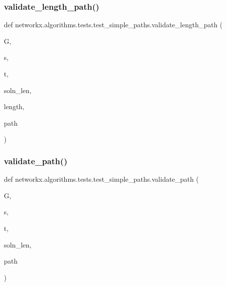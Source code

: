 \subsubsection{\texorpdfstring{validate\+\_\+length\+\_\+path()}{validate\_length\_path()}}
{\footnotesize\ttfamily def networkx.\+algorithms.\+tests.\+test\+\_\+simple\+\_\+paths.\+validate\+\_\+length\+\_\+path (\begin{DoxyParamCaption}\item[{}]{G,  }\item[{}]{s,  }\item[{}]{t,  }\item[{}]{soln\+\_\+len,  }\item[{}]{length,  }\item[{}]{path }\end{DoxyParamCaption})}

\mbox{\label{namespacenetworkx_1_1algorithms_1_1tests_1_1test__simple__paths_a1aaa70999290a6ce43f019694d5fba5b}} 
\subsubsection{\texorpdfstring{validate\+\_\+path()}{validate\_path()}}
{\footnotesize\ttfamily def networkx.\+algorithms.\+tests.\+test\+\_\+simple\+\_\+paths.\+validate\+\_\+path (\begin{DoxyParamCaption}\item[{}]{G,  }\item[{}]{s,  }\item[{}]{t,  }\item[{}]{soln\+\_\+len,  }\item[{}]{path }\end{DoxyParamCaption})}

